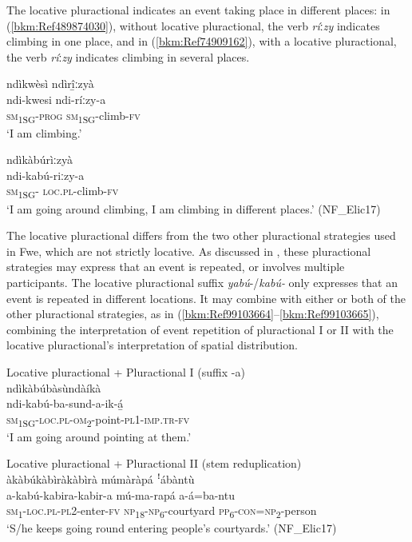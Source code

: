 The locative pluractional indicates an event taking place in different places: in (\ref{bkm:Ref489874030}), without locative pluractional, the verb \textit{rí}ː\textit{zy} indicates climbing in one place, and in (\ref{bkm:Ref74909162}), with a locative pluractional, the verb \textit{rí}ː\textit{zy} indicates climbing in several places.

\ea
\label{bkm:Ref489874030}
ndìkwèsì ndìrî̲ːzyà\\
\gll ndi-kwesi  ndi-ríːzy-a\\
\textsc{sm}\textsubscript{1SG}-\textsc{prog}  \textsc{sm}\textsubscript{1SG}-climb-\textsc{fv}\\
\glt ‘I am climbing.’
\z

\ea
\label{bkm:Ref74909162}
\glll ndìkàbúrìːzyà\\
ndi-kabú-riːzy-a\\
\textsc{sm}\textsubscript{1SG}- \textsc{loc}.\textsc{pl}-climb-\textsc{fv}\\
\glt ‘I am going around climbing, I am climbing in different places.’ (NF\_Elic17)
\z

The locative pluractional differs from the two other pluractional strategies used in Fwe, which are not strictly locative. As discussed in , these pluractional strategies may express that an event is repeated, or involves multiple participants. The locative pluractional suffix \textit{yabú}-/\textit{kabú-} only expresses that an event is repeated in different locations. It may combine with either or both of the other pluractional strategies, as in (\ref{bkm:Ref99103664}--\ref{bkm:Ref99103665}), combining the interpretation of event repetition of pluractional I or II with the locative pluractional’s interpretation of spatial distribution.

\ea
\label{bkm:Ref99103664}
Locative pluractional + Pluractional I (suffix -a)\\
\glll ndìkàbúbàsùndàíkà\\
ndi-kabú-ba-sund-a-ik-á̲\\
\textsc{sm}\textsubscript{1SG}-\textsc{loc}.\textsc{pl}-\textsc{om}\textsubscript{2}-point-\textsc{pl}1-\textsc{imp}.\textsc{tr}-\textsc{fv}\\
\glt ‘I am going around pointing at them.’
\z

\ea
Locative pluractional + Pluractional II (stem reduplication)\\
àkàbúkàbìràkàbìrà múmàràpá ꜝábàntù\\
\gll a-kabú-kabira-kabir-a  mú-ma-rapá    a-á=ba-ntu\\
\textsc{sm}\textsubscript{1}-\textsc{loc}.\textsc{pl}-\textsc{pl}2-enter-\textsc{fv}  \textsc{np}\textsubscript{18}-\textsc{np}\textsubscript{6}-courtyard  \textsc{pp}\textsubscript{6}-\textsc{con}=\textsc{np}\textsubscript{2}-person\\
\glt ‘S/he keeps going round entering people's courtyards.’ (NF\_Elic17)
\z


